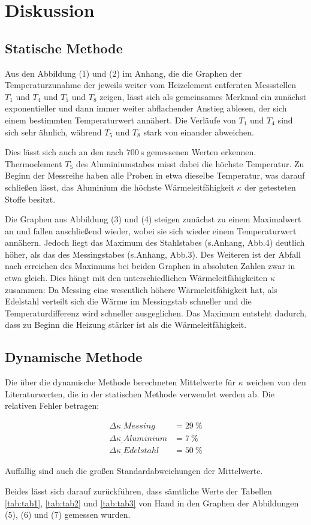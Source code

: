 
\section{Diskussion}
\label{sec:Diskussion}

\subsection{Statische Methode}

Aus den Abbildung (1) und (2) im Anhang, die die Graphen der Temperaturzunahme der jeweils weiter vom Heizelement entfernten Messstellen $T_\text{1}$ und $T_\text{4}$ und $T_\text{5}$ und $T_\text{8}$ zeigen, lässt sich als gemeinsames Merkmal ein zunächst exponentieller und dann immer weiter abflachender Anstieg ablesen, der sich einem bestimmten Temperaturwert annähert.
Die Verläufe von $T_\text{1}$ und $T_\text{4}$ sind sich sehr ähnlich, während $T_\text{5}$ und $T_\text{8}$ stark von einander abweichen.

Dies lässt sich auch an den nach $\SI{700}{\second}$ gemessenen Werten erkennen.
Thermoelement $T_\text{5}$ des Aluminiumstabes misst dabei die höchste Temperatur.
Zu Beginn der Messreihe haben alle Proben in etwa dieselbe Temperatur, was darauf schließen lässt, das Aluminium die höchste Wärmeleitfähigkeit $\kappa$ der getesteten Stoffe besitzt.

Die Graphen aus Abbildung (3) und (4) steigen zunächst zu einem Maximalwert an und fallen anschließend wieder, wobei sie sich wieder einem Temperaturwert annähern.
Jedoch liegt das Maximum des Stahlstabes (s.Anhang, Abb.4)
deutlich höher, als das des Messingstabes (s.Anhang, Abb.3).
Des Weiteren ist der Abfall nach erreichen des Maximums bei beiden Graphen in absoluten Zahlen zwar in etwa gleich.
Dies hängt mit den unterschiedlichen Wärmeleitfähigkeiten $\kappa$ zusammen:
Da Messing eine wesentlich höhere Wärmeleitfähigkeit hat, als Edelstahl verteilt sich die Wärme im Messingstab schneller und die Temperaturdifferenz wird schneller ausgeglichen.
Das Maximum entsteht dadurch, dass zu Beginn die Heizung stärker ist als die Wärmeleitfähigkeit.

\subsection{Dynamische Methode}

Die über die dynamische Methode berechneten Mittelwerte für $\kappa$ weichen von den Literaturwerten, die in der statischen Methode verwendet werden ab. Die relativen Fehler betragen:

\begin{align*}
\Delta\kappa_.{Messing}		&=\SI{29}{\percent}\\
\Delta\kappa_.{Aluminium}	&=\SI{7}{\percent}\\
\Delta\kappa_.{Edelstahl}		&=\SI{50}{\percent}
\end{align*}

Auffällig sind auch die großen Standardabweichungen der Mittelwerte.

Beides lässt sich darauf zurückführen, dass sämtliche Werte der Tabellen \ref{tab:tab1}, \ref{tab:tab2} und \ref{tab:tab3} von Hand in den Graphen der Abbildungen (5), (6) und (7) gemessen wurden.

